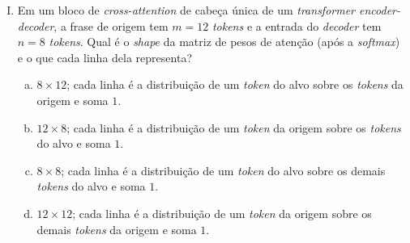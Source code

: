 \documentclass{dlproblemset}
\begin{document}
\begin{enumerate}[I)]
Qual padrão é usado na \textit{self-attention} durante o pré-treinamento de um modelo \textit{decoder-only} autorregressivo (GPT, Llama)?
\begin{enumerate}[a)]
    \item Padrão A: atenção causal, necessária para \textit{next-token prediction} sem ver tokens futuros.
    \item Padrão A: ele permite que cada posição $i$ veja apenas a si mesma, garantindo independência entre os tokens durante o treino.
    \item Padrão B: \textit{decoder-only} requer atenção bidirecional para construir representações contextualizadas dos tokens passados.
    \item Padrão B: sem máscara o modelo aprende mais rapidamente; a propriedade autorregressiva é imposta apenas em inferência.
    \item Padrão C: cada token só atende a si mesmo, o que evita vazamento de informação futura.
    \item A e B são equivalentes do ponto de vista do treinamento autorregressivo.
    \item A e C bloqueiam tokens futuros, então ambos são corretos para \textit{decoder-only}.
    \item Nenhum: \textit{decoder-only} não usa atenção mascarada; apenas \textit{cross-attention} é mascarada.
\end{enumerate}

\newpage
\item Em um bloco de \textit{cross-attention} de cabeça única de um \textit{transformer encoder-decoder}, a frase de origem tem $m = 12$ \textit{tokens} e a entrada do \textit{decoder} tem $n = 8$ \textit{tokens}. Qual é o \textit{shape} da matriz de pesos de atenção (após a \textit{softmax}) e o que cada linha dela representa?

\begin{enumerate}[a)]
    \item $8 \times 12$; cada linha é a distribuição de um \textit{token} do alvo sobre os \textit{tokens} da origem e soma $1$.
    \item $12 \times 8$; cada linha é a distribuição de um \textit{token} da origem sobre os \textit{tokens} do alvo e soma $1$.
    \item $8 \times 8$; cada linha é a distribuição de um \textit{token} do alvo sobre os demais \textit{tokens} do alvo e soma $1$.
    \item $12 \times 12$; cada linha é a distribuição de um \textit{token} da origem sobre os demais \textit{tokens} da origem e soma $1$.
\end{enumerate}

\end{enumerate}
\end{document}

